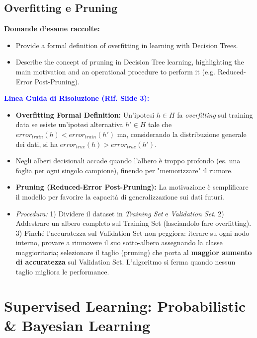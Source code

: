 \documentclass[11pt,a4paper]{article}
\begin{document}
\subsection{Overfitting e Pruning}
\textbf{Domande d'esame raccolte:}
\begin{itemize}
    \item Provide a formal definition of overfitting in learning with Decision Trees.
    \item Describe the concept of pruning in Decision Tree learning, highlighting the main motivation and an operational procedure to perform it (e.g. Reduced-Error Post-Pruning).
\end{itemize}

\textbf{\textcolor{blue}{Linea Guida di Risoluzione (Rif. Slide 3):}}
\begin{itemize}
    \item \textbf{Overfitting Formal Definition:} Un'ipotesi $h \in H$ fa \textit{overfitting} sul training data se esiste un'ipotesi alternativa $h' \in H$ tale che $error_{train}(h) < error_{train}(h')$ ma, considerando la distribuzione generale dei dati, si ha $error_{true}(h) > error_{true}(h')$.
    \item Negli alberi decisionali accade quando l'albero è troppo profondo (es. una foglia per ogni singolo campione), finendo per "memorizzare" il rumore.
    \item \textbf{Pruning (Reduced-Error Post-Pruning):} La motivazione è semplificare il modello per favorire la capacità di generalizzazione sui dati futuri.
    \item \textit{Procedura:} 1) Dividere il dataset in \textit{Training Set} e \textit{Validation Set}. 2) Addestrare un albero completo sul Training Set (lasciandolo fare overfitting). 3) Finché l'accuratezza sul Validation Set non peggiora: iterare su ogni nodo interno, provare a rimuovere il suo sotto-albero assegnando la classe maggioritaria; selezionare il taglio (pruning) che porta al \textbf{maggior aumento di accuratezza} sul Validation Set. L'algoritmo si ferma quando nessun taglio migliora le performance.
\end{itemize}


\section{Supervised Learning: Probabilistic \& Bayesian Learning}
\end{document}
